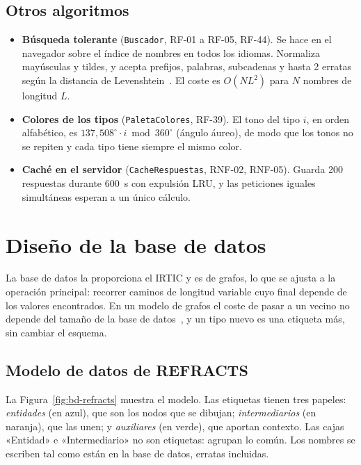 \subsection{Otros algoritmos}
\label{sec:alg-otros}

\begin{itemize}
  \item \textbf{Búsqueda tolerante} (\texttt{Buscador}, RF-01 a RF-05, RF-44). Se hace en el navegador sobre el índice de nombres en todos los idiomas. Normaliza mayúsculas y tildes, y acepta prefijos, palabras, subcadenas y hasta 2 erratas según la distancia de Levenshtein~\cite{levenshtein1966}. El coste es $O(N L^2)$ para $N$ nombres de longitud $L$. 
  \item \textbf{Colores de los tipos} (\texttt{PaletaColores}, RF-39). El tono del tipo $i$, en orden alfabético, es $137{,}508^\circ\cdot i \bmod 360^\circ$ (ángulo áureo), de modo que los tonos no se repiten y cada tipo tiene siempre el mismo color.
  \item \textbf{Caché en el servidor} (\texttt{CacheRespuestas}, RNF-02, RNF-05). Guarda 200 respuestas durante 600~s con expulsión LRU, y las peticiones iguales simultáneas esperan a un único cálculo.
\end{itemize}

\section{Diseño de la base de datos}
\label{sec:bd}

La base de datos la proporciona el IRTIC y es de grafos, lo que se ajusta a la operación principal: recorrer caminos de longitud variable cuyo final depende de los valores encontrados. En un modelo de grafos el coste de pasar a un vecino no depende del tamaño de la base de datos~\cite{robinson2015}, y un tipo nuevo es una etiqueta más, sin cambiar el esquema.

\subsection{Modelo de datos de REFRACTS}

La Figura~\ref{fig:bd-refracts} muestra el modelo. Las etiquetas tienen tres papeles: \emph{entidades} (en azul), que son los nodos que se dibujan; \emph{intermediarios} (en naranja), que las unen; y \emph{auxiliares} (en verde), que aportan contexto. Las cajas «Entidad» e «Intermediario» no son etiquetas: agrupan lo común. Los nombres se escriben tal como están en la base de datos, erratas incluidas.

